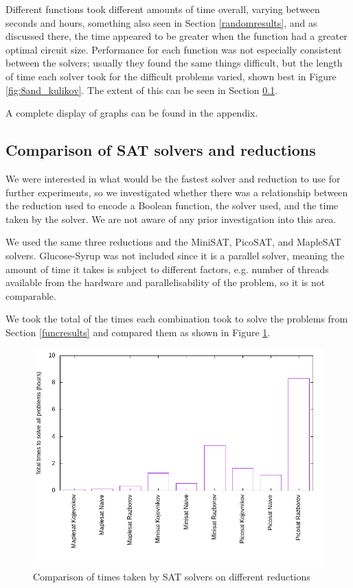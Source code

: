 \documentclass{article}
\begin{document}
Different functions took different amounts of time overall, varying between seconds and hours, something also seen in Section \ref{randomresults}, and as discussed there, the time appeared to be greater when the function had a greater optimal circuit size. Performance for each function was not especially consistent between the solvers; usually they found the same things difficult, but the length of time each solver took for the difficult problems varied, shown best in Figure \ref{fig:8and_kulikov}. The extent of this can be seen in Section \ref{satresults}.

A complete display of graphs can be found in the appendix.


\subsection{Comparison of SAT solvers and reductions} \label{satresults}

We were interested in what would be the fastest solver and reduction to use for further experiments, so we investigated whether there was a relationship between the reduction used to encode a Boolean function, the solver used, and the time taken by the solver. We are not aware of any prior investigation into this area.

We used the same three reductions and the MiniSAT, PicoSAT, and MapleSAT solvers. Glucose-Syrup was not included since it is a parallel solver, meaning the amount of time it takes is subject to different factors, e.g. number of threads available from the hardware and parallelisability of the problem, so it is not comparable.

We took the total of the times each combination took to solve the problems from Section \ref{funcresults} and compared them as shown in Figure \ref{fig:totals}.

\begin{figure}[h!]
  \includegraphics[width=\textwidth]{images/totals.png}
  \caption{Comparison of times taken by SAT solvers on different reductions}
  \label{fig:totals}
\end{figure}
\end{document}
